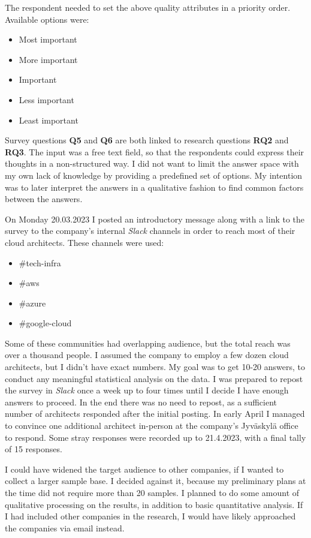 \documentclass[utf8,english]{gradu3}
\begin{document}
The respondent needed to set the above quality attributes in a priority order.
Available options were:
\begin{itemize}
  \item Most important
  \item More important
  \item Important
  \item Less important
  \item Least important
\end{itemize}

Survey questions \textbf{Q5} and \textbf{Q6} are both linked to research
questions \textbf{RQ2} and \textbf{RQ3}.  The input was a free text field, so
that the respondents could express their thoughts in a non-structured way.  I
did not want to limit the answer space with my own lack of knowledge by
providing a predefined set of options.  My intention was to later interpret the
answers in a qualitative fashion to find common factors between the answers.

On Monday 20.03.2023 I posted an introductory message along with a link to the
survey to the company's internal \textit{Slack} channels in order to reach most
of their cloud architects. These channels were used:
\begin{itemize}
  \item \#tech-infra
  \item \#aws
  \item \#azure
  \item \#google-cloud
\end{itemize}

Some of these communities had overlapping audience, but the total reach was over
a thousand people.  I assumed the company to employ a few dozen cloud
architects, but I didn't have exact numbers.  My goal was to get 10-20 answers,
to conduct any meaningful statistical analysis on the data.  I was prepared to
repost the survey in \textit{Slack} once a week up to four times until I decide
I have enough answers to proceed.  In the end there was no need to repost, as a
sufficient number of architects responded after the initial posting.  In early
April I managed to convince one additional architect in-person at the company's
Jyväskylä office to respond.  Some stray responses were recorded up to
21.4.2023, with a final tally of 15 responses.

I could have widened the target audience to other companies, if I wanted to
collect a larger sample base.  I decided against it, because my preliminary
plans at the time did not require more than 20 samples.  I planned to do some
amount of qualitative processing on the results, in addition to basic
quantitative analysis.  If I had included other companies in the research, I
would have likely approached the companies via email instead.
\end{document}
